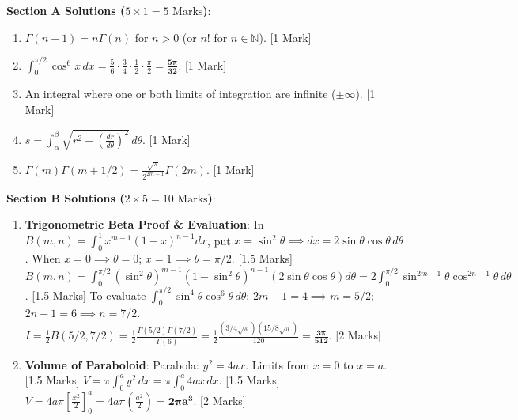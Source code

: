 \begin{solutionbox}
\noindent\textbf{Section A Solutions ($5 \times 1 = 5\text{ Marks}$)}:
\begin{enumerate}
    \item $\Gamma(n+1) = n \Gamma(n)$ for $n > 0$ (or $n!$ for $n \in \mathbb{N}$). [1 Mark]
    \item $\int_0^{\pi/2} \cos^6 x\,dx = \frac{5}{6} \cdot \frac{3}{4} \cdot \frac{1}{2} \cdot \frac{\pi}{2} = \mathbf{\frac{5\pi}{32}}$. [1 Mark]
    \item An integral where one or both limits of integration are infinite ($\pm\infty$). [1 Mark]
    \item $s = \int_\alpha^\beta \sqrt{r^2 + \left(\frac{dr}{d\theta}\right)^2}\,d\theta$. [1 Mark]
    \item $\Gamma(m)\Gamma(m+1/2) = \frac{\sqrt{\pi}}{2^{2m-1}}\Gamma(2m)$. [1 Mark]
\end{enumerate}

\medskip
\noindent\textbf{Section B Solutions ($2 \times 5 = 10\text{ Marks}$)}:
\begin{enumerate}[start=6]
    \item \textbf{Trigonometric Beta Proof \& Evaluation}:
    In $B(m,n) = \int_0^1 x^{m-1}(1-x)^{n-1}dx$, put $x = \sin^2\theta \implies dx = 2\sin\theta\cos\theta\,d\theta$.
    When $x=0 \implies \theta=0$; $x=1 \implies \theta=\pi/2$. [1.5 Marks]
    $B(m,n) = \int_0^{\pi/2} (\sin^2\theta)^{m-1}(1-\sin^2\theta)^{n-1}(2\sin\theta\cos\theta)d\theta = 2\int_0^{\pi/2}\sin^{2m-1}\theta\cos^{2n-1}\theta\,d\theta$. [1.5 Marks]
    To evaluate $\int_0^{\pi/2} \sin^4\theta \cos^6\theta\,d\theta$:
    $2m-1=4 \implies m=5/2$; $2n-1=6 \implies n=7/2$.
    $I = \frac{1}{2} B(5/2, 7/2) = \frac{1}{2}\frac{\Gamma(5/2)\Gamma(7/2)}{\Gamma(6)} = \frac{1}{2}\frac{(3/4\sqrt{\pi})(15/8\sqrt{\pi})}{120} = \mathbf{\frac{3\pi}{512}}$. [2 Marks]

    \item \textbf{Volume of Paraboloid}:
    Parabola: $y^2 = 4ax$. Limits from $x = 0$ to $x = a$. [1.5 Marks]
    $V = \pi \int_0^a y^2\,dx = \pi \int_0^a 4ax\,dx$. [1.5 Marks]
    $V = 4a\pi \left[ \frac{x^2}{2} \right]_0^a = 4a\pi \left(\frac{a^2}{2}\right) = \mathbf{2\pi a^3}$. [2 Marks]
\end{enumerate}


\end{solutionbox}
